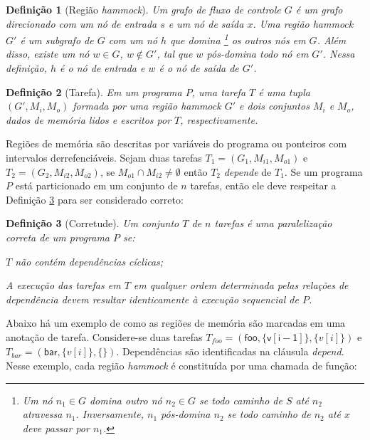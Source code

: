 \documentclass[sigplan,10pt]{acmart}
\newtheorem{Definicao}{Defini\c{c}\~{a}o}
\begin{document}
\begin{Definicao} [Região \textit{hammock}]
\label{def:hammock}
Um grafo de fluxo de controle $G$ é um grafo direcionado com um nó de entrada
$s$ e um nó de saída $x$. Uma região \textit{hammock} $G'$ é um subgrafo de $G$ com um nó $h$ que {\em domina}
\footnote{Um nó $n_1 \in G$ domina outro nó
$n_2 \in G$ se todo caminho de  $S$ até $n_2$ atravessa $n_1$.
Inversamente, $n_1$ pós-domina $n_2$ se todo caminho de $n_2$ até $x$ deve passar por $n_1$.} os outros nós em $G$.
Além disso, existe um nó $w \in G$, $w \notin G'$, tal que $w$ {\em pós-domina} todo nó em $G'$. Nessa definição,
$h$ é o nó de entrada e $w$ é o nó de saída de $G'$.  
\end{Definicao}

\begin{Definicao} [Tarefa]
\label{def:task}
Em um programa $P$, uma tarefa $T$ é uma tupla $(G', M_i, M_o)$ formada
por uma região \textit{hammock} $G'$ e dois conjuntos $M_i$ e $M_o$, dados de memória lidos e escritos por $T$, respectivamente.
\end{Definicao}

Regiões de memória são descritas por variáveis do programa ou ponteiros com intervalos derrefenciáveis.
Sejam duas tarefas $T_1 = (G_1, M_{i1}, M_{o1})$ e $T_2 = (G_2, M_{i2}, M_{o2})$, 
se $M_{o1} \cap M_{i2} \neq \emptyset$ então $T_2$ {\em depende} de $T_1$. Se um programa $P$ está particionado em um 
conjunto de $n$ tarefas, então ele deve respeitar a Definição \ref{def:corretude} para ser considerado correto:

\begin{Definicao} [Corretude]
\label{def:corretude}
Um conjunto $T$ de $n$ tarefas é uma paralelização correta de um programa $P$ se:
\begin{compactenum}
\item $T$ não contém dependências cíclicas;
\item A execução das tarefas em $T$ em qualquer ordem determinada pelas relações de dependência devem resultar
identicamente à execução sequencial de $P$.
\end{compactenum}
\end{Definicao}

Abaixo há um exemplo de como as regiões de memória são marcadas em uma anotação de tarefa.
Considere-se duas tarefas $T_{\mathit{foo}} = (\mathsf{foo}, \{\mathsf{v[i - 1]}\},
\{v[i]\})$ e $T_{\mathit{bar}} = (\mathsf{bar}, \{v[i]\}, \{\})$. Dependências são identificadas na cláusula \textit{depend}. 
Nesse exemplo, cada região \textit{hammock} é constituída por uma chamada de função:
\end{document}

